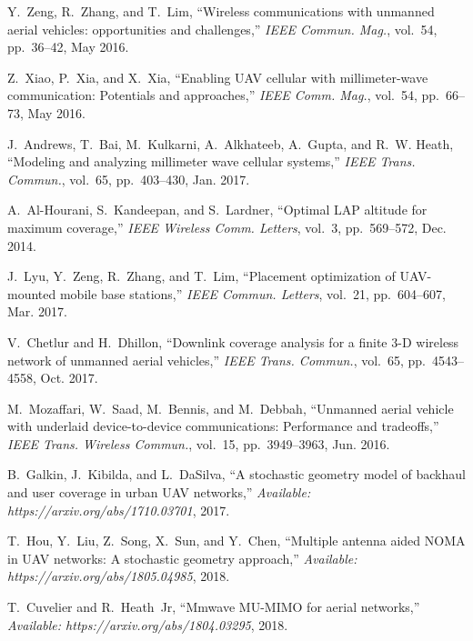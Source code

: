 \documentclass[12pt, draftclsnofoot, onecolumn]{IEEEtran}
\begin{document}

%
\begin{thebibliography}{10}

Y.~Zeng, R.~Zhang, and T.~Lim, ``Wireless communications with unmanned aerial
  vehicles: {o}pportunities and challenges,'' {\em IEEE Commun. Mag.}, vol.~54,
  pp.~36--42, May 2016.

Z.~Xiao, P.~Xia, and X.~Xia, ``Enabling {UAV} cellular with millimeter-wave
  communication: {P}otentials and approaches,'' {\em IEEE Comm. Mag.}, vol.~54,
  pp.~66--73, May 2016.

J.~Andrews, T.~Bai, M.~Kulkarni, A.~Alkhateeb, A.~Gupta, and R.~W. Heath,
  ``Modeling and analyzing millimeter wave cellular systems,'' {\em IEEE Trans.
  Commun.}, vol.~65, pp.~403--430, Jan. 2017.

A.~Al-Hourani, S.~Kandeepan, and S.~Lardner, ``Optimal {LAP} altitude for
  maximum coverage,'' {\em IEEE Wireless Comm. Letters}, vol.~3, pp.~569--572,
  Dec. 2014.

J.~Lyu, Y.~Zeng, R.~Zhang, and T.~Lim, ``Placement optimization of
  {UAV}-mounted mobile base stations,'' {\em IEEE Commun. Letters}, vol.~21,
  pp.~604--607, Mar. 2017.

V.~Chetlur and H.~Dhillon, ``Downlink coverage analysis for a finite 3-{D}
  wireless network of unmanned aerial vehicles,'' {\em IEEE Trans. Commun.},
  vol.~65, pp.~4543--4558, Oct. 2017.

M.~Mozaffari, W.~Saad, M.~Bennis, and M.~Debbah, ``Unmanned aerial vehicle with
  underlaid device-to-device communications: {P}erformance and tradeoffs,''
  {\em IEEE Trans. Wireless Commun.}, vol.~15, pp.~3949--3963, Jun. 2016.

B.~Galkin, J.~Kibilda, and L.~DaSilva, ``A stochastic geometry model of
  backhaul and user coverage in urban {UAV} networks,'' {\em Available:
  https://arxiv.org/abs/1710.03701}, 2017.

T.~Hou, Y.~Liu, Z.~Song, X.~Sun, and Y.~Chen, ``Multiple antenna aided {NOMA}
  in {UAV} networks: A stochastic geometry approach,'' {\em Available:
  https://arxiv.org/abs/1805.04985}, 2018.

T.~Cuvelier and R.~Heath~Jr, ``Mmwave {MU}-{MIMO} for aerial networks,'' {\em
  Available: https://arxiv.org/abs/1804.03295}, 2018.


\end{thebibliography}
\end{document}
